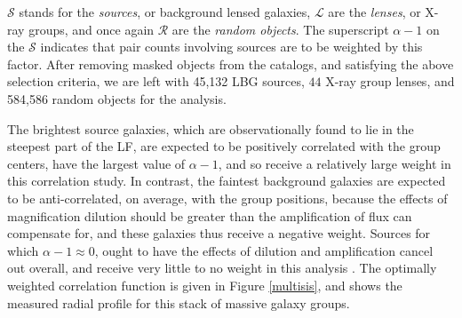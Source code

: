 $\mathscr{S}$ stands for the {\it sources}, or background lensed galaxies, $\mathscr{L}$ are the {\it lenses}, or X-ray groups, and once again $\mathscr{R}$ are the {\it random objects}. The superscript $\alpha-1$ on the $\mathscr{S}$ indicates that pair counts involving sources are to be weighted by this factor.  After removing masked objects from the catalogs, and satisfying the above selection criteria, we are left with 45,132 \ac{LBG} sources, $44$ X-ray group lenses, and 584,586 random objects for the analysis.

\begin{table}
  \begin{center}


   \caption[Luminosity Function Parameters]{\ac{LF} (Schechter) parameters from external \ac{LBG} measurements. $^a$ \ac{LF} parameters from \protect \citet{vanderBurg10}. $^b$ \ac{LF} parameters from \protect \citet{Sawicki06}.}
 \label{LFtable}
  \end{center}
\end{table}


The brightest source galaxies, which are observationally found to lie in the steepest part of the \ac{LF}, are expected to be positively correlated with the group centers, have the largest value of $\alpha-1$, and so receive a relatively large weight in this correlation study.  In contrast, the faintest background galaxies are expected to be anti-correlated, on average, with the group positions, because the effects of magnification dilution should be greater than the amplification of flux can compensate for, and these galaxies thus receive a negative weight.  Sources for which $\alpha-1 \approx 0$, ought to have the effects of dilution and amplification cancel out overall, and receive very little to no weight in this analysis \citep{Scranton05}. The optimally weighted correlation function is given in Figure \ref{multisis}, and shows the measured radial profile for this stack of massive galaxy groups.

